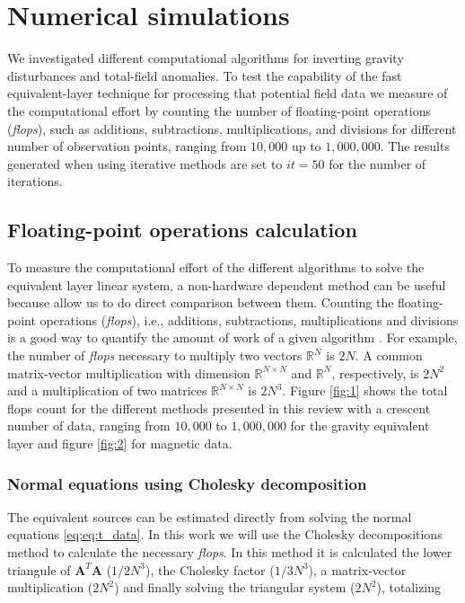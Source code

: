 \section{Numerical simulations}
\label{sec:num_simulations}

We investigated different computational algorithms for inverting gravity disturbances and total-field anomalies. To test the capability of the fast equivalent-layer technique for processing that potential field data we measure of the computational effort by counting the number of floating-point operations (\textit{flops}), such as additions, subtractions, multiplications, and divisions \citep{golub-vanloan2013} for different number of observation points, ranging from $10,000$ up to $1, 000, 000$. The results generated when using iterative methods are set to $\textit{it} = 50$ for the number of iterations.
 
\subsection{Floating-point operations calculation}

To measure the computational effort of the different algorithms to solve the equivalent layer linear system, a non-hardware dependent method can be useful because allow us to do direct comparison between them. Counting the floating-point operations (\textit{flops}), i.e., additions, subtractions, multiplications and divisions is a good way to quantify the amount of work of a given algorithm \citep{golub-vanloan2013}. For example, the number of \textit{flops} necessary to multiply two vectors $\mathbb{R}^{N}$ is $2N$. A common matrix-vector multiplication with dimension $\mathbb{R}^{N \times N}$ and $\mathbb{R}^{N}$, respectively, is $2N^2$ and a multiplication of two matrices $\mathbb{R}^{N \times N}$ is $2N^3$. Figure \ref{fig:1} shows the total flops count for the different methods presented in this review with a crescent number of data, ranging from $10,000$ to $1,000,000$ for the gravity equivalent layer and figure \ref{fig:2} for magnetic data. 

\subsubsection{Normal equations using Cholesky decomposition}

The equivalent sources can be estimated directly from solving the normal equations \ref{eq:eq:t_data}. In this work we will use the Cholesky decompositions method to calculate the necessary \textit{flops}. In this method it is calculated the lower triangule of $\mathbf{A}^T\mathbf{A}$ ($1/2 N^3$), the Cholesky factor ($1/3 N^3$), a matrix-vector multiplication ($2N^2$) and finally solving the triangular system ($2N^2$), totalizing

